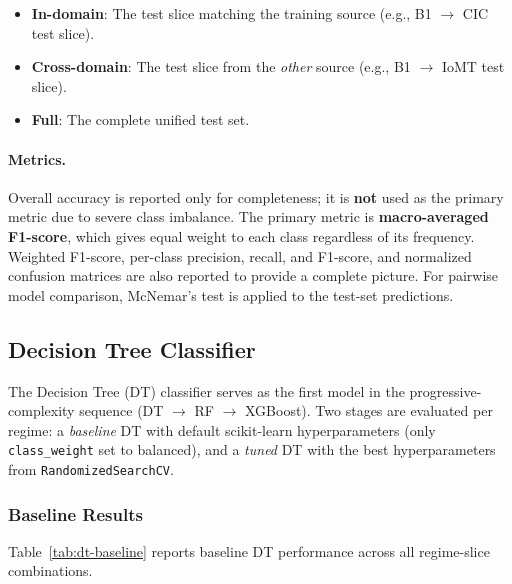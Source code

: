 \begin{itemize}[nosep]
  \item \textbf{In-domain}: The test slice matching the training source (e.g., B1 $\to$ CIC test slice).
  \item \textbf{Cross-domain}: The test slice from the \emph{other} source (e.g., B1 $\to$ IoMT test slice).
  \item \textbf{Full}: The complete unified test set.
\end{itemize}

\paragraph{Metrics.}
Overall accuracy is reported only for completeness; it is \textbf{not} used as the primary metric due to severe class imbalance. The primary metric is \textbf{macro-averaged F1-score}, which gives equal weight to each class regardless of its frequency. Weighted F1-score, per-class precision, recall, and F1-score, and normalized confusion matrices are also reported to provide a complete picture. For pairwise model comparison, McNemar's test is applied to the test-set predictions.

\subsection{Decision Tree Classifier}
\label{subsec:decision-tree}

The Decision Tree (DT) classifier serves as the first model in the progressive-complexity sequence (DT $\to$ RF $\to$ XGBoost). Two stages are evaluated per regime: a \emph{baseline} DT with default scikit-learn hyperparameters (only \texttt{class\_weight} set to balanced), and a \emph{tuned} DT with the best hyperparameters from \texttt{RandomizedSearchCV}.

\subsubsection{Baseline Results}

Table~\ref{tab:dt-baseline} reports baseline DT performance across all regime-slice combinations.

